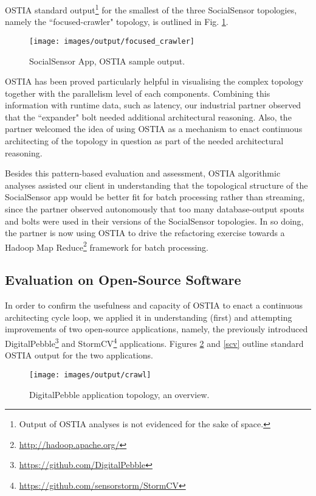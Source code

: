 OSTIA standard output\footnote{Output of OSTIA analyses is not evidenced for the
sake of space.} for the smallest of the three SocialSensor topologies, namely
the ``focused-crawler" topology, is outlined in Fig. \ref{topo1}.

\begin{figure}[H]
		\texttt{[image: images/output/focused\_crawler]}
		\caption{SocialSensor App, OSTIA sample output.}
		\label{topo1}
\end{figure}

OSTIA has been proved particularly helpful in visualising the complex topology
together with the parallelism level of each components. Combining this
information with runtime data, such as latency, our industrial partner observed
that the ``expander" bolt needed additional architectural reasoning. Also, the
partner welcomed the idea of using OSTIA as a mechanism to enact continuous
architecting of the topology in question as part of the needed architectural
reasoning.

Besides this pattern-based evaluation and assessment, OSTIA algorithmic analyses
assisted our client in understanding that the topological structure of the
SocialSensor app would be better fit for batch processing rather than streaming,
since the partner observed autonomously that too many database-output spouts and
bolts were used in their versions of the SocialSensor topologies. In so doing,
the partner is now using OSTIA to drive the refactoring exercise towards a
Hadoop Map Reduce\footnote{\url{http://hadoop.apache.org/}} framework for batch
processing.

\subsection{Evaluation on Open-Source Software}\label{os}

In order to confirm the usefulness and capacity of OSTIA to enact a continuous
architecting cycle loop, we applied it in understanding (first) and attempting
improvements of two open-source applications, namely, the previously introduced
DigitalPebble\footnote{\url{https://github.com/DigitalPebble}} and
StormCV\footnote{\url{https://github.com/sensorstorm/StormCV}}
applications. Figures \ref{dp} and \ref{scv} outline standard OSTIA output for
the two applications.

\begin{figure}
\begin{center}
		\texttt{[image: images/output/crawl]}
		\caption{DigitalPebble application topology, an overview.}
		\label{dp}
		\end{center}
\end{figure}

